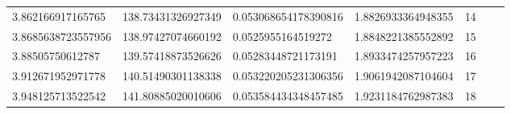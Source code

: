 \documentclass[11pt,twoside,a4paper]{article}
\begin{document}
\begin{table}[htb]
\begin{tabular}{lllllll}
3.862166917165765                         & 138.73431326927349                       & 0.053068654178390816                        & 1.8826933364948355                        & 14      &  \\
3.8685638723557956                        & 138.97427074660192                       & 0.0525955164519272                          & 1.8848221385552892                        & 15      &  \\
3.88505750612787                          & 139.57418873526626                       & 0.05283448721173191                         & 1.8933474257957223                        & 16      &  \\
3.912671952971778                         & 140.51490301138338                       & 0.053220205231306356                        & 1.9061942087104604                        & 17      &  \\
3.948125713522542                         & 141.80885020010606                       & 0.053584434348457485                        & 1.9231184762987383                        & 18      & 
\end{tabular}
\end{table}


\vspace{2cm}
\end{document}
